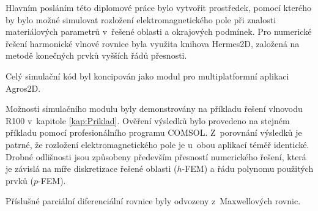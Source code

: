 
Hlavním posláním této diplomové práce bylo vytvořit prostředek, pomocí kterého by bylo možné simulovat rozložení elektromagnetického pole při znalosti materiálových parametrů v~řešené oblasti a okrajových podmínek. Pro numerické řešení harmonické vlnové rovnice byla využita knihova Hermes2D, založená na metodě konečných prvků vyšších řádů přesnosti.

Celý simulační kód byl koncipován jako modul pro multiplatformní aplikaci Agros2D.  


Možnosti simulačního modulu byly demonstrovány na příkladu řešení vlnovodu R100 v~kapitole \ref{kap:Priklad}. Ověření výsledků bylo provedeno na stejném příkladu pomocí profesionálního programu COMSOL. Z~porovnání výsledků je patrné, že rozložení elektromagnetického pole je u~obou aplikací téměř identické. Drobné odlišnosti jsou způsobeny především přesností numerického řešení, která je závislá na míře diskretizace řešené oblasti ($h$-FEM) a řádu polynomu použitých prvků ($p$-FEM).

Příslušné parciální diferenciální rovnice byly odvozeny z~Maxwellových rovnic.

